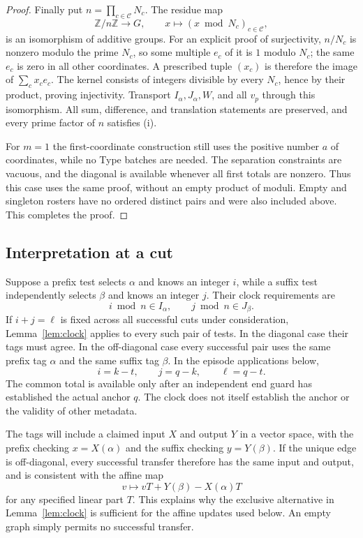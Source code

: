 \begin{proof}
Finally put $n=\prod_{c\in\mathcal C}N_c$.  The residue map
\[
 \mathbb Z/n\mathbb Z\longrightarrow G,
 \qquad x\longmapsto(x\bmod N_c)_{c\in\mathcal C},
\]
is an isomorphism of additive groups.  For an explicit proof of
surjectivity, $n/N_c$ is nonzero modulo the prime $N_c$, so some
multiple $e_c$ of it is $1$ modulo $N_c$; the same $e_c$ is zero in
all other coordinates.  A prescribed tuple $(x_c)$ is therefore the
image of $\sum_c x_ce_c$.  The kernel consists of integers divisible
by every $N_c$, hence by their product, proving injectivity.  Transport
$I_\alpha,J_\alpha,W$, and all $v_p$ through this isomorphism.  All
sum, difference, and translation statements are preserved, and every
prime factor of $n$ satisfies \textup{(i)}.

For $m=1$ the first-coordinate construction still uses the positive
number $a$ of coordinates, while no Type batches are needed.  The
separation constraints are vacuous, and the diagonal is available
whenever all first totals are nonzero.  Thus this case uses the same
proof, without an empty product of moduli.  Empty and singleton
rosters have no ordered distinct pairs and were also included above.
This completes the proof.
\end{proof}

\subsection{Interpretation at a cut}

Suppose a prefix test selects $\alpha$ and knows an integer $i$, while
a suffix test independently selects $\beta$ and knows an integer $j$.
Their clock requirements are
\[
 i\bmod n\in I_\alpha,\qquad j\bmod n\in J_\beta.
\]
If $i+j=\ell$ is fixed across all successful cuts under consideration,
Lemma~\ref{lem:clock} applies to every such pair of tests.  In the
diagonal case their tags must agree.  In the off-diagonal case every
successful pair uses the same prefix tag $\alpha$ and the same suffix
tag $\beta$.
In the episode applications below,
\[
 i=k-t,\qquad j=q-k,\qquad \ell=q-t.
\]
The common total is available only after an independent end guard
has established the actual anchor $q$.  The clock does not itself
establish the anchor or the validity of other metadata.

The tags will include a claimed input $X$ and output $Y$ in a vector
space, with the prefix checking $x=X(\alpha)$ and the suffix checking
$y=Y(\beta)$.  If the unique edge is off-diagonal, every successful
transfer therefore has the same input and output, and is consistent
with the affine map
\[
 v\longmapsto vT+Y(\beta)-X(\alpha)T
\]
for any specified linear part $T$.  This explains why the exclusive
alternative in Lemma~\ref{lem:clock} is sufficient for the affine
updates used below.  An empty graph simply permits no successful
transfer.

